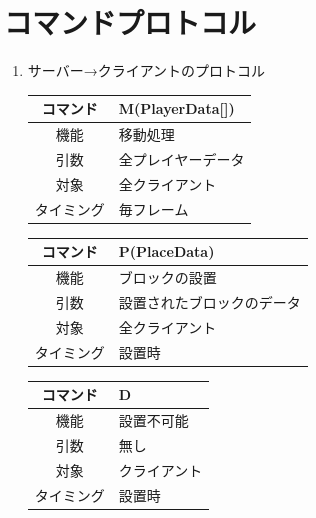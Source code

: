 \documentclass{jarticle}
\begin{document}
\section{コマンドプロトコル}

\begin{enumerate}
    \item サーバー→クライアントのプロトコル
    \begin{table}[H]
        \label{table:command1-1}
        \begin{center}
            \begin{tabular}{|c||p{30em}|}\hline
                コマンド&M(PlayerData[])\\\hline
                機能&移動処理\\
                引数&全プレイヤーデータ\\
                対象&全クライアント\\
                タイミング&毎フレーム\\\hline
            \end{tabular}
        \end{center}
    \end{table}
    \begin{table}[H]
        \label{table:command1-2}
        \begin{center}
            \begin{tabular}{|c||p{30em}|}\hline
                コマンド&P(PlaceData)\\\hline
                機能&ブロックの設置\\
                引数&設置されたブロックのデータ\\
                対象&全クライアント\\
                タイミング&設置時\\\hline
            \end{tabular}
        \end{center}
    \end{table}
    \begin{table}[H]
        \label{table:command1-3}
        \begin{center}
            \begin{tabular}{|c||p{30em}|}\hline
                コマンド&D\\\hline
                機能&設置不可能\\
                引数&無し\\
                対象&クライアント\\
                タイミング&設置時\\\hline

\end{tabular}
\end{center}
\end{table}
\end{enumerate}
\end{document}
